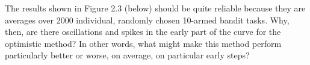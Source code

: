 
\begin{exercise}

The results shown in Figure 2.3 (below) should be quite reliable because they are
averages over 2000 individual, randomly chosen 10-armed bandit tasks. Why, then,
are there oscillations and spikes in the early part of the curve for the optimistic
method? In other words, what might make this method perform particularly better or
worse, on average, on particular early steps?

\end{exercise}


